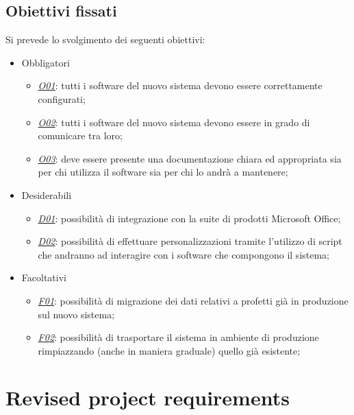 \subsection*{Obiettivi fissati}
Si prevede lo svolgimento dei seguenti obiettivi:
\begin{itemize}
	\item Obbligatori
	\begin{itemize}
		\item \underline{\textit{O01}}: tutti i software del nuovo sistema devono essere correttamente configurati;
		\item \underline{\textit{O02}}: tutti i software del nuovo sistema devono essere in grado di comunicare tra loro;
		\item \underline{\textit{O03}}: deve essere presente una documentazione chiara ed appropriata sia per chi utilizza il software sia per chi lo andrà a mantenere;
	\end{itemize}
	
	\item Desiderabili 
	\begin{itemize}
		\item \underline{\textit{D01}}: possibilità di integrazione con la suite di prodotti Microsoft Office;
		\item \underline{\textit{D02}}: possibilità di effettuare personalizzazioni tramite l'utilizzo di script che andranno ad interagire con i software che compongono il sistema;
	\end{itemize}
	
	\item Facoltativi
	\begin{itemize}
		\item \underline{\textit{F01}}: possibilità di migrazione dei dati relativi a profetti già in produzione sul nuovo sistema;
		\item \underline{\textit{F02}}: possibilità di trasportare il sistema in ambiente di produzione rimpiazzando (anche in maniera graduale) quello già esistente;
	\end{itemize} 
\end{itemize}

\section{Revised project requirements}

